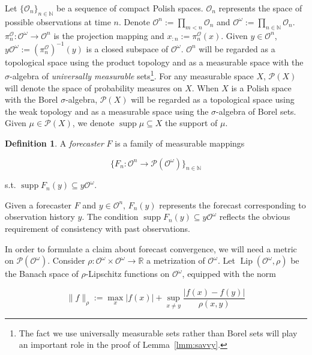\documentclass[11pt]{article}
\theoremstyle{definition}
\newtheorem{definition}{Definition}%
\theoremstyle{plain}
\newcommand{\Nats}{\mathbb{N}}
\newcommand{\Reals}{\mathbb{R}}
\newcommand{\A}[1]{\lvert #1 \rvert}
\newcommand{\N}[1]{\lVert #1 \rVert}
\newcommand{\Sq}[2]{\{#1\}_{#2 \in \Nats}}
\newcommand{\Sqn}[1]{\Sq{#1}{n}}
\newcommand{\PM}{\mathcal{P}}
\newcommand{\Lp}{{\operatorname{Lip}}}
\DeclareMathOperator{\Sp}{supp}
\newcommand{\Ob}{\mathcal{O}}
\newcommand{\OO}{\Ob^\omega}
\newcommand{\PO}{\pi^\Ob}
\newcommand{\PMO}{\PM(\OO)}
\begin{document}
Let $\Sqn{\Ob_n}$ be a sequence of compact Polish spaces. $\Ob_n$ represents the space of possible observations at time $n$. Denote $\Ob^n := \prod_{m < n} \Ob_n$  and $\Ob^\omega:=\prod_{n \in \Nats} \Ob_n$. $\PO_n: \Ob^\omega \rightarrow \Ob^n$ is the projection mapping and $x_{:n}:=\PO_n\left(x\right)$. Given $y \in \Ob^n$, $y\OO := \left(\PO_n\right)^{-1}\left(y\right)$ is a closed subspace of $\OO$. $\Ob^n$ will be regarded as a topological space using the product topology and as a measurable space with the $\sigma$-algebra of \emph{universally measurable} sets\footnote{The fact we use universally measurable sets rather than Borel sets will play an important role in the proof of Lemma~\ref{lmm:savvy}.}. For any measurable space $X$, $\PM\left(X\right)$ will denote the space of probability measures on $X$. When $X$ is a Polish space with the Borel $\sigma$-algebra, $\PM\left(X\right)$ will be regarded as a topological space using the weak topology and as a measurable space using the $\sigma$-algebra of Borel sets. Given $\mu \in \PM\left(X\right)$, we denote $\Sp \mu \subseteq X$ the support of $\mu$.

\begin{samepage}
\begin{definition}

A \emph{forecaster} $F$ is a family of measurable mappings

\[\Sqn{F_n: \Ob^n \rightarrow \PMO}\]

s.t. $\Sp {F_n\left(y\right)} \subseteq y\OO$.

\end{definition}
\end{samepage}

Given a forecaster $F$ and $y \in \Ob^n$, $F_n\left(y\right)$ represents the forecast corresponding to observation history $y$. The condition $\Sp {F_n\left(y\right)} \subseteq y\OO$ reflects the obvious requirement of consistency with past observations.

In order to formulate a claim about forecast convergence, we will need a metric on $\PMO$. Consider $\rho: \OO \times \OO \rightarrow \Reals$ a metrization of $\OO$. Let $\Lp\left(\OO,\rho\right)$ be the Banach space of $\rho$-Lipschitz functions on $\OO$, equipped with the norm

\begin{equation}
\N{f}_\rho:=\max_{x}{\A{f\left(x\right)}} + \sup_{x \ne y} \frac{\A{f\left(x\right)-f\left(y\right)}}{\rho\left(x,y\right)}
\end{equation}
\end{document}
